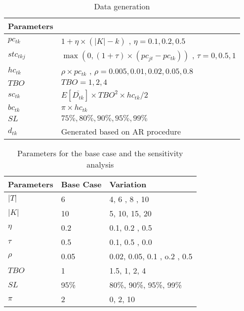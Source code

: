 \documentclass[10pt]{article}
\newcommand{\ti}{t} %
\newcommand{\TI}{T}
\newcommand{\ka}{k} %
\newcommand{\KA}{K}
\newcommand{\jey}{j} %
\begin{document}
\begin{table}[H]
\centering
\caption{Data generation }
\begin{tabular}{ll}
\toprule
{\bf Parameters} &  \\ \midrule
$pc_{\ti \ka}$  & $1+\eta \times(|\KA|-\ka)$   , $\eta = 0.1, 0.2 , 0.5$ \\
$stc_{\ti \ka \jey }$  & $\max(0,(1+\tau) \times (pc_{jt} - pc_{\ti \ka}))$ , $\tau = 0 , 0.5 , 1$  \\ 
$hc_{\ti \ka}$  & $\rho \times pc_{\ti \ka} $ , $\rho = 0.005, 0.01, 0.02, 0.05 ,0.8$   \\ 
$TBO$  &  $TBO = 1, 2, 4$   \\ 
$sc_{\ti \ka}$ & $E[\overline{D_{\ti \ka}}] \times TBO^2 \times hc_{\ti \ka} /2$ \\ 
$bc_{\ti \ka}$  &  $\pi \times hc_{\ti \ka}$ \\
$SL$  &  $ 75\%, 80\%, 90\%, 95\%, 99\%$ \\
${d}_{\ti \ka}$  & Generated based on AR procedure
 \\ \bottomrule
\end{tabular}
 \label{tab:Sub_FD_parameters}
\end{table}





\begin{table}[H]
\centering
\caption{ Parameters for the base case and the sensitivity analysis} \label{tab:BaseSensitivity}
\begin{tabular}{lll}
\toprule
{\bf Parameters} & Base Case & Variation \\ \midrule
$|\TI|$   & 6 & 4, 6 , 8 , 10\\ 
$|\KA|$   & 10 & 5, 10, 15, 20\\ 
$\eta$  &   0.2 & 0.1, 0.2 , 0.5   \\ 
$\tau$  &   0.5 & 0.1, 0.5 , 0.0   \\ 
$\rho $  &   0.05 & 0.02, 0.05, 0.1 , o.2 , 0.5   \\ 
$ TBO $  &   1 & 1.5, 1, 2, 4   \\ 
$ SL $  &95\% & 80\%, 90\%, 95\%, 99\%  \\ 
$ \pi $  &   2 & 0, 2, 10  \\ 
\bottomrule 
\end{tabular}
\end{table}
\end{document}
